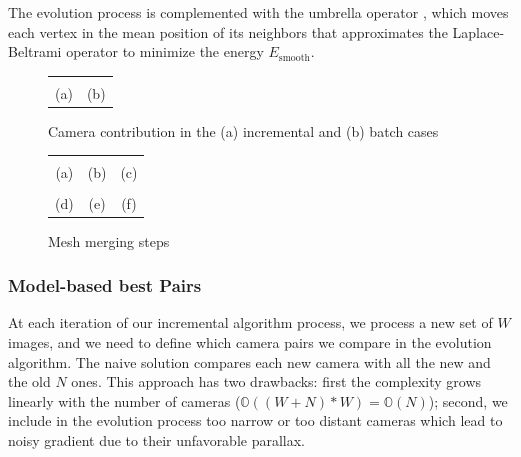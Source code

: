 \documentclass[times,10pt,twocolumn]{article}
\begin{document}
The evolution process is complemented with the umbrella operator \cite{wardetzky2007discrete}, which moves each vertex in the mean position of its neighbors that approximates the Laplace-Beltrami operator to minimize the energy $E_{\textrm{smooth}}$.


\begin{figure}[t]
\centering
\setlength{\tabcolsep}{1px}
\begin{tabular}{cc}
  {\def\svgwidth{0.23\textwidth}
  }&
  {\def\svgwidth{0.23\textwidth}
  }\\
  (a)&(b)
\end{tabular}
\caption{Camera contribution in the (a) incremental  and (b) batch cases}
\label{fig:increm}
\end{figure}


\begin{figure}[t]
\centering
\setlength{\tabcolsep}{1px}
\begin{tabular}{ccc}
{\def\svgwidth{0.32\textwidth}
  }&
{\def\svgwidth{0.32\textwidth}
  }&
{\def\svgwidth{0.32\textwidth}
  }\\
(a)&(b)&(c)\\
{\def\svgwidth{0.32\textwidth}
  }&
{\def\svgwidth{0.32\textwidth}
  }&
{\def\svgwidth{0.32\textwidth}
  }\\
(d)&(e)&(f)\\
\end{tabular}
\label{fig:mesh_merging}
\caption{Mesh merging steps}
\end{figure}


\subsubsection{Model-based best Pairs}
\label{subsec:pair}
At each iteration of our incremental algorithm process, we process a new set of $W$ images, and we need to define which camera pairs we compare in the evolution algorithm.
The naive solution compares each new camera with all the new and the old $N$ ones.
This approach has two drawbacks: first the complexity grows linearly with the number of cameras ($\mathbb{O}((W+N)*W) = \mathbb{O}(N)$); second, we include in the evolution process too narrow or too distant cameras which lead to noisy gradient due to their unfavorable parallax.
\end{document}
